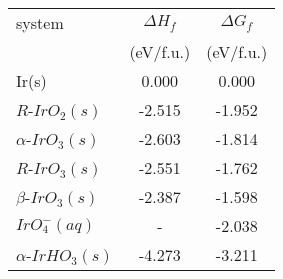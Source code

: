 \begin{tabular}{lcc}
\toprule
                 system & $\Delta H_{f}$ & $\Delta G_{f}$ \\
                        &      (eV/f.u.) &      (eV/f.u.) \\
\midrule
                  Ir(s) &          0.000 &          0.000 \\
       $R$-$IrO_{2}(s)$ &         -2.515 &         -1.952 \\
  $\alpha$-$IrO_{3}(s)$ &         -2.603 &         -1.814 \\
       $R$-$IrO_{3}(s)$ &         -2.551 &         -1.762 \\
   $\beta$-$IrO_{3}(s)$ &         -2.387 &         -1.598 \\
      $IrO_{4}^{-}(aq)$ &              - &         -2.038 \\
 $\alpha$-$IrHO_{3}(s)$ &         -4.273 &         -3.211 \\
\bottomrule
\end{tabular}
